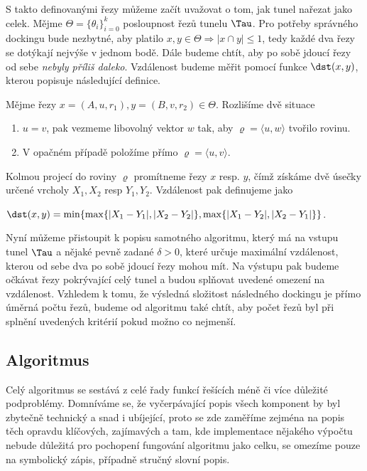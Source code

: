 S takto definovanými řezy můžeme začít uvažovat o tom, jak tunel nařezat jako celek.
Mějme $ \Theta = \{\theta_i\}_{i=0}^{k}$ posloupnost řezů tunelu $ \Tau $. Pro potřeby správného
dockingu bude nezbytné, aby platilo $ x, y \in \Theta \Rightarrow |x \cap y| \leq 1 $,
tedy každé dva řezy se dotýkají nejvýše v jednom bodě. Dále budeme chtít, aby po sobě
jdoucí řezy od sebe \textit{nebyly příliš daleko}. Vzdálenost budeme měřit pomocí funkce
$ \dst(x, y) $, kterou popisuje následující definice.

\begin{defi}
Mějme řezy $ x = (A, u, r_1), y = (B, v, r_2) \in \Theta $. Rozlišíme dvě situace
    \begin{enumerate}[label={(\arabic*)}]
        \item $ u = v $, pak vezmeme libovolný vektor $ w $ tak, aby
            $ \varrho = \langle u, w \rangle $ tvořilo rovinu.
        \item V opačném případě položíme přímo $ \varrho = \langle u, v \rangle $.
    \end{enumerate}
Kolmou projecí do roviny $ \varrho $ promítneme řezy $x $ resp. $y$, čímž získáme dvě úsečky
určené vrcholy $X_1, X_2 $ resp $Y_1, Y_2 $. Vzdálenost pak definujeme jako
    \begin{center}
        $ \dst(x, y) = \min\{ \max\{|X_1 - Y_1|, |X_2 - Y_2|\}, \max\{|X_1 - Y_2|, |X_2 - Y_1|\}\}$.
    \end{center}
\end{defi}

Nyní můžeme přistoupit k popisu samotného algoritmu, který má na vstupu tunel $ \Tau $
a nějaké pevně zadané $ \delta > 0$, které určuje maximální vzdálenost, kterou
od sebe dva po sobě jdoucí řezy mohou mít. Na výstupu pak budeme očkávat řezy pokrývající
celý tunel a budou splňovat uvedené omezení na vzdálenost. Vzhledem k tomu, že výsledná
složitost následného dockingu je přímo úměrná počtu řezů, budeme od algoritmu také chtít,
aby počet řezů byl při splnění uvedených kritérií pokud možno co nejmenší.


\subsection{Algoritmus}

Celý algoritmus se sestává z celé řady funkcí řešících méně či více důležité podproblémy.
Domníváme se, že vyčerpávající popis všech komponent by byl zbytečně technický a snad i
ubíjející, proto se zde zaměříme zejména na popis těch opravdu klíčových, zajímavých
a tam, kde implementace nějakého výpočtu nebude důležitá pro pochopení fungování
algoritmu jako celku, se omezíme pouze na symbolický zápis, případně stručný slovní
popis.


